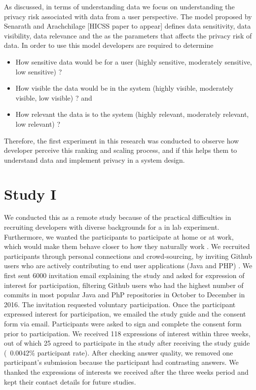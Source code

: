 \documentclass{sigchi}
\begin{document}
As discussed, in terms of understanding data we focus on understanding the privacy risk associated with data from a user perspective. The model  proposed by Senarath and Arachchilage [HICSS paper to appear] defines data sensitivity, data visibility, data relevance and the as the parameters that affects the privacy risk of data. In order to use this model developers are required to determine 
\begin{itemize}
\item How sensitive data would be for a user (highly sensitive, moderately sensitive, low sensitive) ?
\item How visible the data would be in the system (highly visible, moderately visible, low visible) ? and
\item How relevant the data is to the system (highly relevant, moderately relevant, low relevant) ?
\end{itemize}

Therefore, the first experiment in this research was conducted to observe how developer perceive this ranking and scaling process, and if this helps them to understand data and implement privacy in a system design. 

\section {Study I }

We conducted this as a remote study because of the practical difficulties in recruiting developers with diverse backgrounds for a in lab experiment. Furthermore, we wanted the participants to participate at home or at work, which would make them behave closer to how they naturally work \cite {wermke2017security, acar2017comparing}. We recruited participants through personal connections and crowd-sourcing, by inviting Github users who are actively contributing to end user applications (Java and PHP) \cite {wermke2017security}. We first sent 6000 invitation email explaining the study and asked for expression of interest for participation, filtering Github users who had the highest number of commits in most popular Java and PhP repositories in October to December in 2016. The invitation requested voluntary participation. Once the participant expressed interest for participation, we emailed the study guide and the consent form via email. Participants were asked to sign and complete the consent form prior to participation. We received 118 expressions of interest within three weeks, out of which 25 agreed to participate in the study after receiving the study guide (~0.0042\% participant rate). After checking answer quality, we removed one participant's submission because the participant had contrasting answers. We thanked the expressions of interests we received after the three weeks period and kept their contact details for future studies.
\end{document}
